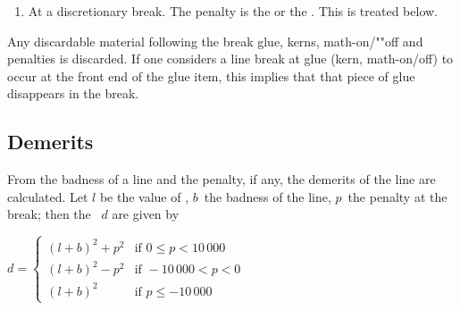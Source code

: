 \documentclass{book}
\begin{document}
\begin{enumerate}
\item At a discretionary break. The penalty
is the  or the .
This is treated below.
\end{enumerate}

Any discardable material following the break \ldash glue, kerns,
\mdqon
math-on/""off and penalties \rdash  is discarded. If one considers
\mdqoff
a line break at glue (kern, math-on{/}off) to occur at the
front end of the glue item, this implies that that piece
of glue disappears in the break.

\subsection{Demerits}

From the badness of a line and the penalty, if any, the demerits
of the line are calculated. Let $l$ be the value of
, $b$~the badness of the line,
$p$~the penalty at the break; then the ~$d$
are given by
\begin{disp}$\displaystyle d=
\begin{cases} (l+b)^2+p^2& \text{if } 0\leq p<10\,000 \\
           (l+b)^2-p^2&\text{if } -10\,000<p<0 \\
           (l+b)^2    &\text{if } p\leq-10\,000 \end{cases}$\end{disp}
\end{document}
